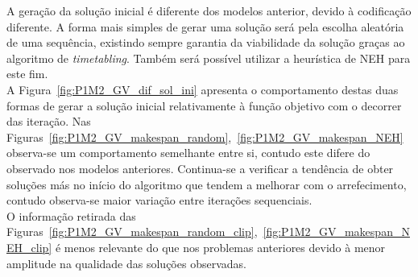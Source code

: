 A geração da solução inicial é diferente dos modelos anterior, devido à codificação diferente. A forma mais simples de gerar uma solução será pela escolha aleatória de uma sequência, existindo sempre garantia da viabilidade da solução graças ao algoritmo de \textit{timetabling}. Também será possível utilizar a heurística de NEH para este fim.\\
A Figura~\ref{fig:P1M2_GV_dif_sol_ini} apresenta o comportamento destas duas formas de gerar a solução inicial relativamente à função objetivo com o decorrer das iteração. Nas Figuras~\ref{fig:P1M2_GV_makespan_random},~\ref{fig:P1M2_GV_makespan_NEH} observa-se um comportamento semelhante entre si, contudo este difere do observado nos modelos anteriores. Continua-se a verificar a tendência de obter soluções más no início do algoritmo que tendem a melhorar com o arrefecimento, contudo observa-se maior variação entre iterações sequenciais.\\

O informação retirada das Figuras~\ref{fig:P1M2_GV_makespan_random_clip},~\ref{fig:P1M2_GV_makespan_NEH_clip} é menos relevante do que nos problemas anteriores devido à menor amplitude na qualidade das soluções observadas.\\

